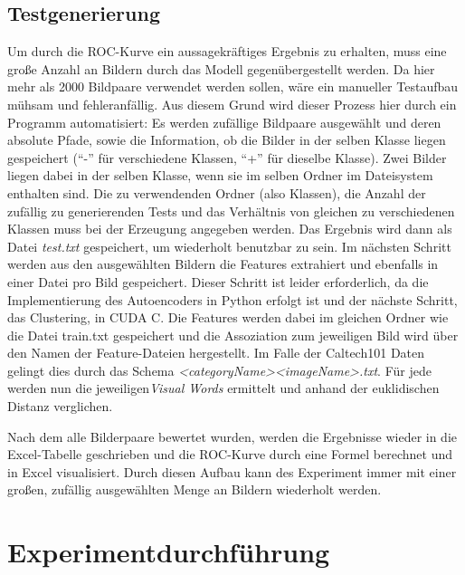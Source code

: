 \subsection{Testgenerierung}

Um durch die ROC-Kurve ein aussagekräftiges Ergebnis zu erhalten, muss eine große Anzahl an Bildern durch das Modell gegenübergestellt werden. Da hier mehr als 2000 Bildpaare verwendet werden sollen, wäre ein manueller Testaufbau mühsam und fehleranfällig. Aus diesem Grund wird dieser Prozess hier durch ein Programm automatisiert: Es werden zufällige Bildpaare ausgewählt und deren absolute Pfade, sowie die Information, ob die Bilder in der selben Klasse liegen gespeichert (\enquote{-} für verschiedene Klassen, \enquote{+} für dieselbe Klasse). Zwei Bilder liegen dabei in der selben Klasse, wenn sie im selben Ordner im Dateisystem enthalten sind. Die zu verwendenden Ordner (also Klassen), die Anzahl der zufällig zu generierenden Tests und das Verhältnis von gleichen zu verschiedenen Klassen muss bei der Erzeugung angegeben werden. Das Ergebnis wird dann als Datei \textit{test.txt} gespeichert, um wiederholt benutzbar zu sein.\newline
Im nächsten Schritt werden aus den ausgewählten Bildern die Features extrahiert und ebenfalls in einer Datei pro Bild gespeichert. Dieser Schritt ist leider erforderlich, da die Implementierung des Autoencoders in Python erfolgt ist und der nächste Schritt, das Clustering, in CUDA C. Die Features werden dabei im gleichen Ordner wie die Datei train.txt gespeichert und die Assoziation zum jeweiligen Bild wird über den Namen der Feature-Dateien hergestellt. Im Falle der Caltech101 Daten gelingt dies durch das Schema \textit{<categoryName>\textunderscore <imageName>.txt}.
Für jede werden nun die jeweiligen\textit{Visual Words} ermittelt und anhand der euklidischen Distanz verglichen. 

Nach dem alle Bilderpaare bewertet wurden, werden die Ergebnisse wieder in die Excel-Tabelle geschrieben und die ROC-Kurve durch eine Formel berechnet und in Excel visualisiert. Durch diesen Aufbau kann des Experiment immer mit einer großen, zufällig ausgewählten Menge an Bildern wiederholt werden.

\section{Experimentdurchführung}

